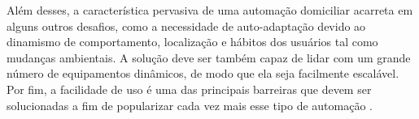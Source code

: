 Além desses, a característica pervasiva de uma automação domiciliar acarreta em alguns outros desafios, como
a necessidade de auto-adaptação devido ao dinamismo de comportamento, localização e hábitos dos usuários tal
como mudanças ambientais. A solução deve ser também capaz de lidar com um grande número de equipamentos
dinâmicos, de modo que ela seja facilmente escalável. Por fim, a facilidade de uso é uma das principais
barreiras que devem ser solucionadas a fim de popularizar cada vez mais esse tipo de automação
\cite{lalanda2010}.
